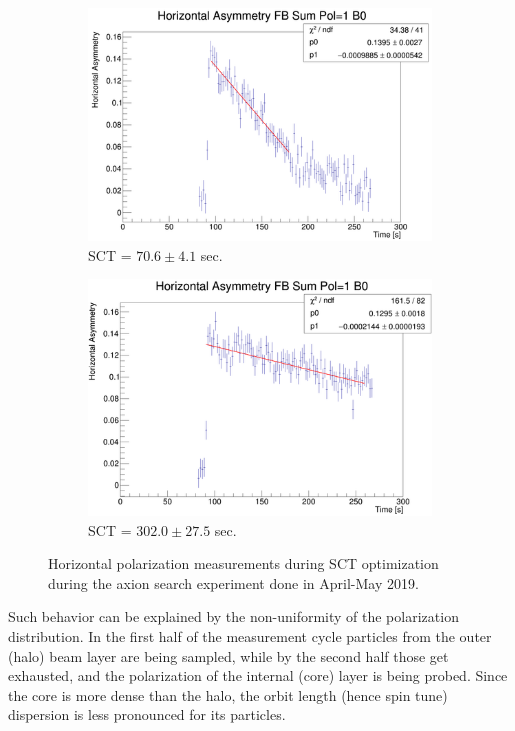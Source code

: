 \begin{figure}[h]\ContinuedFloat\centering
	\begin{subfigure}{\linewidth}
		\includegraphics[height=.35\paperheight]{images/chapter4/SCT-April-2019/11th_20-31}
		\caption{SCT = $70.6 \pm 4.1$ sec.\label{fig:Polarization:halo-and-core-similar}}
	\end{subfigure}
	\begin{subfigure}{\linewidth}
		\includegraphics[height=.35\paperheight]{images/chapter4/SCT-April-2019/13th_03-23}
		\caption{SCT = $302.0 \pm 27.5$ sec.}
	\end{subfigure}
	\caption{Horizontal polarization measurements during SCT optimization during the axion search experiment done in April-May 2019.\label{fig:April2019:Polarization}}
\end{figure}

Such behavior can be explained by the non-uniformity of the polarization distribution. In the first half
of the measurement cycle particles from the outer (halo) beam layer are being sampled, while by the second half
those get exhausted, and the polarization of the internal (core) layer is being probed. Since the core is
more dense than the halo, the orbit length (hence spin tune) dispersion is less pronounced 
for its particles.

